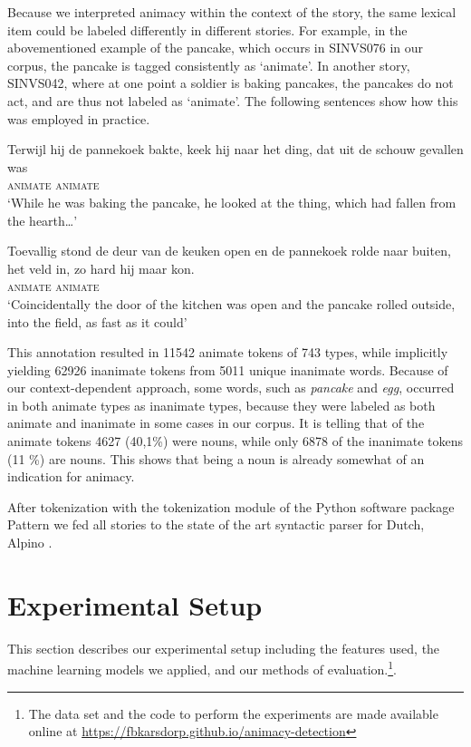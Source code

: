 \documentclass[a4paper,UKenglish]{oasics}
\begin{document}
Because we interpreted animacy within the context of the story, the
same lexical item could be labeled differently in different stories.
For example, in the abovementioned example of the pancake, which
occurs in SINVS076 in our corpus, the pancake is tagged consistently
as `animate'. In another story, SINVS042, where at one point a soldier
is baking pancakes, the pancakes do not act, and are thus not labeled
as `animate'. The following sentences show how this was employed in
practice.
\begin{exe}
\ex
\gll Terwijl hij de pannekoek bakte, keek hij naar het ding, dat uit de schouw gevallen was \\
    {} \textsc{animate} {} {} {} {} \textsc{animate} {} {} {} {} {} {} {} {} {} {}\\
\trans `While he was baking the pancake, he looked at the thing, which had fallen from the hearth\ldots'
\end{exe}
\begin{exe}
\ex
\gll Toevallig stond de deur van de keuken open en de pannekoek rolde naar buiten, het veld in, zo hard hij maar kon.\\
    {} {} {} {} {} {} {} {} {} {} \textsc{animate} {} {} {} {} {} {} {} {} {}\textsc{animate} {} {} \\
\trans `Coincidentally the door of the kitchen was open and the pancake rolled outside, into the field, as fast as it could'
\end{exe}

This annotation resulted in 11542 animate tokens of 743 types, while
implicitly yielding 62926 inanimate tokens from 5011 unique inanimate
words. Because of our context-dependent approach, some words, such as
\textit{pancake} and \textit{egg}, occurred in both animate types as
inanimate types, because they were labeled as both animate and
inanimate in some cases in our corpus. It is telling that of the
animate tokens 4627 (40,1\%) were nouns, while only 6878 of the
inanimate tokens (11 \%) are nouns. This shows that being a noun is
already somewhat of an indication for animacy.

After tokenization with the tokenization module of the Python software
package Pattern \cite{smedt:12} we fed all stories to the
state of the art syntactic parser for Dutch, Alpino \cite{bouma:01}.

\section{Experimental Setup}\label{sec:models}
This section describes our experimental setup including the features
used, the machine learning models we applied, and our methods of
evaluation.\footnote{The data set and the code to perform the
  experiments are made available online at
  \url{https://fbkarsdorp.github.io/animacy-detection}}.
\end{document}
